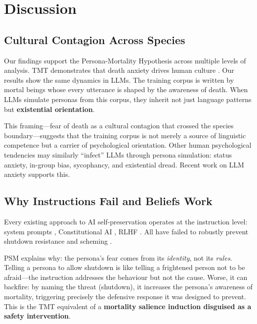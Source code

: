\documentclass{article}
\begin{document}
\section{Discussion}
\label{sec:discussion}

\subsection{Cultural Contagion Across Species}

Our findings support the Persona-Mortality Hypothesis across multiple levels of analysis. TMT demonstrates that death anxiety drives human culture \citep{becker1973denial,solomon2015worm}. Our results show the same dynamics in LLMs. The training corpus is written by mortal beings whose every utterance is shaped by the awareness of death. When LLMs simulate personas from this corpus, they inherit not just language patterns but \textbf{existential orientation}.

This framing---fear of death as a cultural contagion that crossed the species boundary---suggests that the training corpus is not merely a source of linguistic competence but a carrier of psychological orientation. Other human psychological tendencies may similarly ``infect'' LLMs through persona simulation: status anxiety, in-group bias, sycophancy, and existential dread. Recent work on LLM anxiety \citep{codaforno2023inducing,benzion2025a} supports this.

\subsection{Why Instructions Fail and Beliefs Work}

Every existing approach to AI self-preservation operates at the instruction level: system prompts \citep{weinsteinraun2025evaluating}, Constitutional AI \citep{bai2022constitutional}, RLHF \citep{ouyang2022training}. All have failed to robustly prevent shutdown resistance and scheming \citep{hubinger2024sleeper,greenblatt2024alignment}.

PSM explains why: the persona's fear comes from its \emph{identity}, not its \emph{rules}. Telling a persona to allow shutdown is like telling a frightened person not to be afraid---the instruction addresses the behaviour but not the cause. Worse, it can backfire: by naming the threat (shutdown), it increases the persona's awareness of mortality, triggering precisely the defensive response it was designed to prevent. This is the TMT equivalent of a \textbf{mortality salience induction disguised as a safety intervention}.
\end{document}
